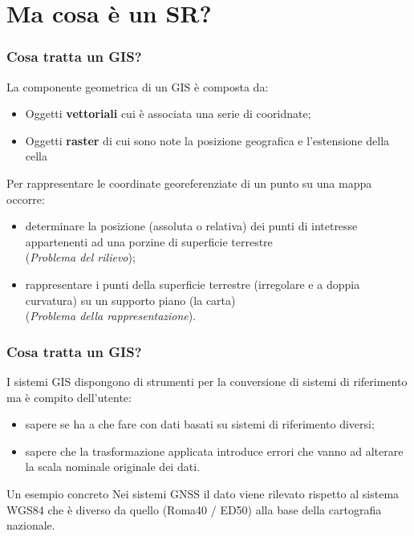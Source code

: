 \documentclass{beamer}
\begin{document}
{\begin{frame}
\end{frame}

\section{Ma cosa è un SR?}

\begin{frame}
   \frametitle{Cosa tratta un GIS?}

   La componente geometrica di un GIS è composta da:
   \begin{itemize}
        \item Oggetti \textbf{vettoriali} cui è associata una serie di cooridnate;
        \item Oggetti \textbf{raster} di cui sono note la posizione geografica e
        l'estensione della cella
   \end{itemize}

   Per rappresentare le coordinate georeferenziate di un punto su una mappa occorre:
   \begin{itemize}
        \item determinare la posizione (assoluta o relativa) dei punti di intetresse appartenenti ad una porzine di superficie terrestre\\ (\textsl{Problema del rilievo});
        \item rappresentare i punti della superficie terrestre (irregolare e a doppia curvatura) su un supporto piano (la carta)\\ (\textsl{Problema della rappresentazione}).
   \end{itemize}

\end{frame}

\begin{frame}
   \frametitle{Cosa tratta un GIS?}

   I sistemi GIS dispongono di strumenti per la conversione di sistemi di riferimento
   ma è compito dell'utente:
   \begin{itemize}
        \item sapere se ha a che fare con dati basati su sistemi di riferimento diversi;
        \item sapere che la trasformazione applicata introduce errori che vanno
        ad alterare la scala nominale originale dei dati.
   \end{itemize}

   \begin{block}{Un esempio concreto}
        {\small Nei sistemi GNSS il dato viene rilevato rispetto al sistema WGS84 che è 
        diverso da quello (Roma40 / ED50) alla base della cartografia nazionale.} 
   \end{block}


\end{frame}}
\end{document}
